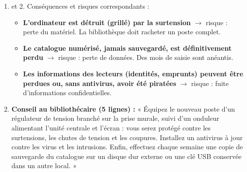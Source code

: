 \documentclass[11pt]{article}
\newcommand{\cle}[1]{{\popxbold\color{popdark}#1}}
\begin{document}
\begin{corrige}
\begin{enumerate}
\item et 2. Conséquences et risques correspondants :
\begin{itemize}
\item \textbf{L'ordinateur est détruit (grillé) par la surtension} $\rightarrow$ risque : \cle{perte du matériel}. La bibliothèque doit racheter un poste complet.
\item \textbf{Le catalogue numérisé, jamais sauvegardé, est définitivement perdu} $\rightarrow$ risque : \cle{perte de données}. Des mois de saisie sont anéantis.
\item \textbf{Les informations des lecteurs (identités, emprunts) peuvent être perdues ou, sans antivirus, avoir été piratées} $\rightarrow$ risque : \cle{fuite d'informations confidentielles}.
\end{itemize}
\item \textbf{Conseil au bibliothécaire (5 lignes) :} « Équipez le nouveau poste d'un régulateur de tension branché sur la prise murale, suivi d'un onduleur alimentant l'unité centrale et l'écran : vous serez protégé contre les surtensions, les chutes de tension et les coupures. Installez un antivirus à jour contre les virus et les intrusions. Enfin, effectuez chaque semaine une copie de sauvegarde du catalogue sur un disque dur externe ou une clé USB conservée dans un autre local. »
\end{enumerate}
\end{corrige}
\end{document}
